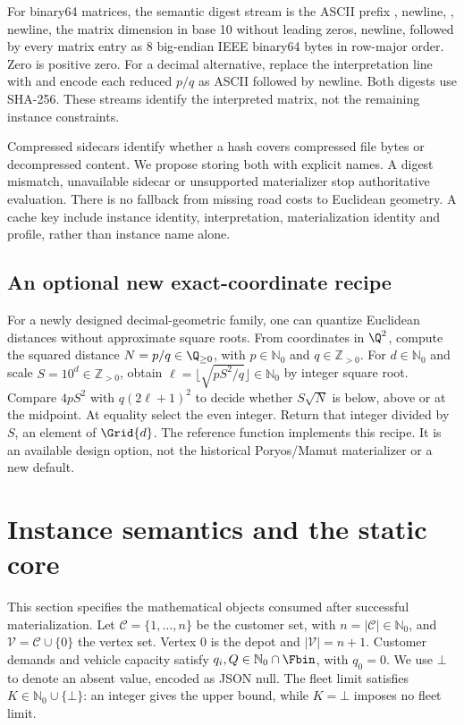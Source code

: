For binary64 matrices, the semantic digest stream is the ASCII prefix , newline, , newline, the matrix dimension in base 10 without leading zeros, newline, followed by every matrix entry as 8 big-endian IEEE binary64 bytes in row-major order. Zero is positive zero. For a decimal alternative, replace the interpretation line with  and encode each reduced $p/q$ as ASCII  followed by newline. Both digests use SHA-256. These streams identify the interpreted matrix, not the remaining instance constraints.

Compressed sidecars \must{} identify whether a hash covers compressed file bytes or decompressed content. We propose storing both with explicit names. A digest mismatch, unavailable sidecar or unsupported materializer \must{} stop authoritative evaluation. There is no fallback from missing road costs to Euclidean geometry. A cache key \must{} include instance identity, interpretation, materialization identity and profile, rather than instance name alone.

\subsection{An optional new exact-coordinate recipe}
For a newly designed decimal-geometric family, one can quantize Euclidean distances without approximate square roots. From coordinates in $\Q^2$, compute the squared distance $N=p/q\in\Q_{\geq0}$, with $p\in\mathbb{N}_0$ and $q\in\mathbb{Z}_{>0}$. For $d\in\mathbb{N}_0$ and scale $S=10^d\in\mathbb{Z}_{>0}$, obtain $\ell=\lfloor\sqrt{pS^2/q}\rfloor\in\mathbb{N}_0$ by integer square root. Compare $4pS^2$ with $q(2\ell+1)^2$ to decide whether $S\sqrt{N}$ is below, above or at the midpoint. At equality select the even integer. Return that integer divided by $S$, an element of $\Grid{d}$. The reference function  implements this recipe. It is an available design option, not the historical Poryos/Mamut materializer or a new default.

\section{Instance semantics and the static core}\label{sec:core}
This section specifies the mathematical objects consumed after successful materialization. Let $\mathcal{C}=\{1,\ldots,n\}$ be the customer set, with $n=|\mathcal{C}|\in\mathbb{N}_0$, and $\mathcal{V}=\mathcal{C}\cup\{0\}$ the vertex set. Vertex 0 is the depot and $|\mathcal{V}|=n+1$. Customer demands and vehicle capacity satisfy $q_i,Q\in\mathbb{N}_0\cap\Fbin$, with $q_0=0$. We use $\bot$ to denote an absent value, encoded as JSON null. The fleet limit satisfies $K\in\mathbb{N}_0\cup\{\bot\}$: an integer gives the upper bound, while $K=\bot$ imposes no fleet limit.

